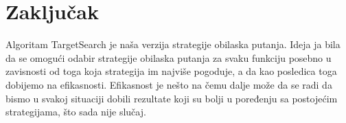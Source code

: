 \documentclass[a4paper]{article}
\begin{document}
\section{Zaključak}
Algoritam TargetSearch je naša verzija strategije obilaska putanja. Ideja ja bila da se omogući odabir strategije obilaska putanja za svaku funkciju posebno u zavisnosti od toga koja strategija im najviše pogoduje, a da kao posledica toga dobijemo na efikasnosti. Efikasnost je nešto na čemu dalje može da se radi da bismo u svakoj situaciji dobili rezultate koji su bolji u poređenju sa postojećim strategijama, što sada nije slučaj.    

\newpage
{}
\appendix
 


\appendix
\end{document}
